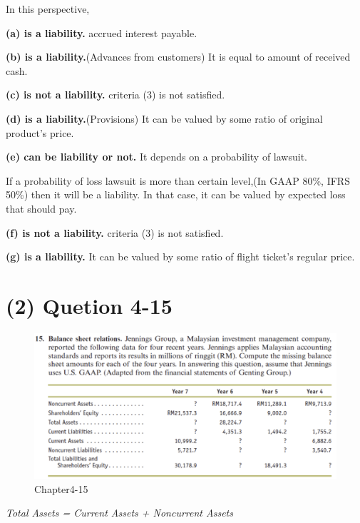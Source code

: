 \documentclass[
  letterpaper,
  DIV=11,
  numbers=noendperiod]{scrreprt}
\begin{document}
In this perspective,

\textbf{(a) is a liability.} accrued interest payable.

\textbf{(b) is a liability.}(Advances from customers) It is equal to
amount of received cash.

\textbf{(c) is not a liability.} criteria (3) is not satisfied.

\textbf{(d) is a liability.}(Provisions) It can be valued by some ratio
of original product's price.

\textbf{(e) can be liability or not.} It depends on a probability of
lawsuit.

If a probability of loss lawsuit is more than certain level,(In GAAP
80\%, IFRS 50\%) then it will be a liability. In that case, it can be
valued by expected loss that should pay.

\textbf{(f) is not a liability.} criteria (3) is not satisfied.

\textbf{(g) is a liability.} It can be valued by some ratio of flight
ticket's regular price.

\section*{(2) Quetion 4-15}\label{quetion-4-15}


\begin{figure}[H]

{\centering \includegraphics{images/재무회계_4-15.png}

}

\caption{Chapter4-15}

\end{figure}%

\emph{Total Assets = Current Assets + Noncurrent Assets}
\end{document}

